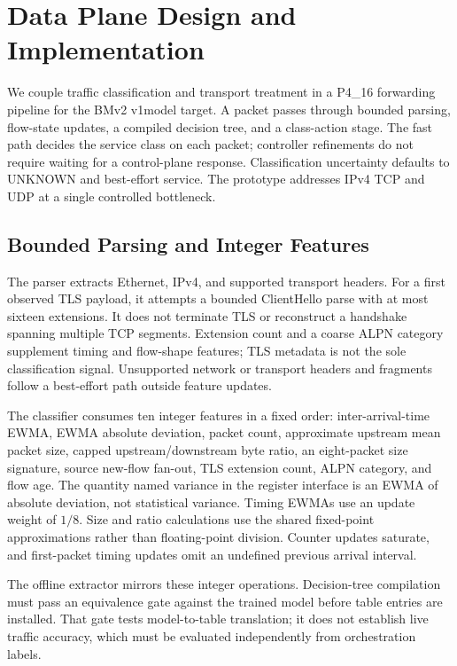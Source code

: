 
\section{Data Plane Design and Implementation}
\label{sec:dataplane}

We couple traffic classification and transport treatment in a P4\_16 forwarding pipeline
for the BMv2 v1model target. A packet passes through bounded parsing, flow-state updates,
a compiled decision tree, and a class-action stage. The fast path decides the service
class on each packet; controller refinements do not require waiting for a control-plane
response. Classification uncertainty defaults to UNKNOWN and best-effort service.
The prototype addresses IPv4 TCP and UDP at a single controlled bottleneck.

\subsection{Bounded Parsing and Integer Features}

The parser extracts Ethernet, IPv4, and supported transport headers. For a first observed
TLS payload, it attempts a bounded ClientHello parse with at most sixteen extensions.
It does not terminate TLS or reconstruct a handshake spanning multiple TCP segments.
Extension count and a coarse ALPN category supplement timing and flow-shape features;
TLS metadata is not the sole classification signal. Unsupported network or transport
headers and fragments follow a best-effort path outside feature updates.

The classifier consumes ten integer features in a fixed order: inter-arrival-time EWMA,
EWMA absolute deviation, packet count, approximate upstream mean packet size, capped
upstream/downstream byte ratio, an eight-packet size signature, source new-flow fan-out,
TLS extension count, ALPN category, and flow age. The quantity named variance in the
register interface is an EWMA of absolute deviation, not statistical variance.
Timing EWMAs use an update weight of $1/8$. Size and ratio calculations use the shared
fixed-point approximations rather than floating-point division. Counter updates saturate,
and first-packet timing updates omit an undefined previous arrival interval.

The offline extractor mirrors these integer operations. Decision-tree compilation must
pass an equivalence gate against the trained model before table entries are installed.
That gate tests model-to-table translation; it does not establish live traffic accuracy,
which must be evaluated independently from orchestration labels.

